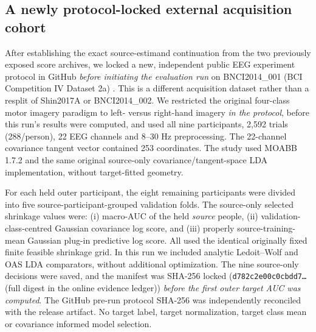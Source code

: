 \subsection{A newly protocol-locked external acquisition cohort}
\label{sec:v20-new-external}
After establishing the exact source-estimand continuation
from the two previously exposed score archives, we locked
a new, independent public EEG experiment protocol in
GitHub \emph{before initiating the evaluation run} on
BNCI2014\_001 (BCI Competition IV Dataset 2a)
\cite{tangermann2012bciiv,jayaram2018moabb}.
This is a different acquisition dataset rather than a
resplit of Shin2017A or BNCI2014\_002. We restricted
the original four-class motor imagery paradigm to
left- versus right-hand imagery \emph{in the protocol},
before this run's results were computed, and used all
nine participants, 2,592 trials (288/person),
22 EEG channels and 8--30 Hz preprocessing.
The 22-channel covariance tangent vector contained
253 coordinates. The study used MOABB 1.7.2 and the
same original source-only covariance/tangent-space
LDA implementation, without target-fitted geometry.

For each held outer participant, the eight
remaining participants were divided into
five source-participant-grouped validation folds.
The source-only selected shrinkage values were:
(i) macro-AUC of the held \emph{source} people,
(ii) validation-class-centred Gaussian covariance
log score, and (iii) properly source-training-mean
Gaussian plug-in predictive log score.
All used the identical originally fixed finite
feasible shrinkage grid. In this run
we included analytic Ledoit--Wolf and OAS LDA
comparators, without additional optimization.
The nine source-only decisions were saved,
and the manifest was SHA-256 locked
(\texttt{d782c2e00c0cbdd7\ldots} (full digest in the online evidence ledger))
\emph{before the first outer target AUC was computed}.
The GitHub pre-run protocol SHA-256 was independently
reconciled with the release artifact.
No target label, target normalization, target
class mean or covariance informed model selection.

